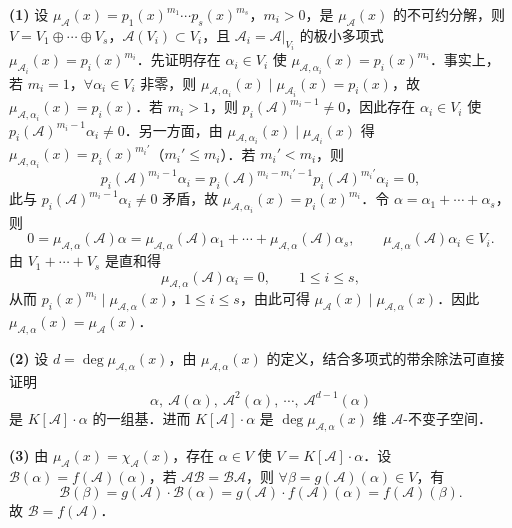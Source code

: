 \begin{solution}
\textbf{(1)} 设 $\mu_{\mathcal{A}}(x)=p_1(x)^{m_1}\cdots p_s(x)^{m_s}$，$m_i>0$，是 $\mu_{\mathcal{A}}(x)$ 的不可约分解，则 $V=V_1\oplus\cdots\oplus V_s$，$\mathcal{A}(V_i)\subset V_i$，且 $\mathcal{A}_i=\mathcal{A}|_{V_i}$ 的极小多项式 $\mu_{\mathcal{A}_i}(x)=p_i(x)^{m_i}$．先证明存在 $\alpha_i\in V_i$ 使 $\mu_{\mathcal{A},\alpha_i}(x)=p_i(x)^{m_i}$．事实上，若 $m_i=1$，$\forall\alpha_i\in V_i$ 非零，则 $\mu_{\mathcal{A},\alpha_i}(x)\mid\mu_{\mathcal{A}_i}(x)=p_i(x)$，故 $\mu_{\mathcal{A},\alpha_i}(x)=p_i(x)$．若 $m_i>1$，则 $p_i(\mathcal{A})^{m_i-1}\neq 0$，因此存在 $\alpha_i\in V_i$ 使 $p_i(\mathcal{A})^{m_i-1}\alpha_i\neq 0$．另一方面，由 $\mu_{\mathcal{A},\alpha_i}(x)\mid\mu_{\mathcal{A}_i}(x)$ 得 $\mu_{\mathcal{A},\alpha_i}(x)=p_i(x)^{m_i'}$（$m_i'\leqslant m_i$）．若 $m_i'<m_i$，则
\[
p_i(\mathcal{A})^{m_i-1}\alpha_i=p_i(\mathcal{A})^{m_i-m_i'-1}p_i(\mathcal{A})^{m_i'}\alpha_i=0,
\]
此与 $p_i(\mathcal{A})^{m_i-1}\alpha_i\neq 0$ 矛盾，故 $\mu_{\mathcal{A},\alpha_i}(x)=p_i(x)^{m_i}$．令 $\alpha=\alpha_1+\cdots+\alpha_s$，则
\[
0=\mu_{\mathcal{A},\alpha}(\mathcal{A})\alpha
=\mu_{\mathcal{A},\alpha}(\mathcal{A})\alpha_1+\cdots+\mu_{\mathcal{A},\alpha}(\mathcal{A})\alpha_s,
\qquad \mu_{\mathcal{A},\alpha}(\mathcal{A})\alpha_i\in V_i.
\]
由 $V_1+\cdots+V_s$ 是直和得
\[
\mu_{\mathcal{A},\alpha}(\mathcal{A})\alpha_i=0,\qquad 1\leqslant i\leqslant s,
\]
从而 $p_i(x)^{m_i}\mid\mu_{\mathcal{A},\alpha}(x)$，$1\leqslant i\leqslant s$，由此可得 $\mu_{\mathcal{A}}(x)\mid\mu_{\mathcal{A},\alpha}(x)$．因此 $\mu_{\mathcal{A},\alpha}(x)=\mu_{\mathcal{A}}(x)$．

\textbf{(2)} 设 $d=\deg\mu_{\mathcal{A},\alpha}(x)$，由 $\mu_{\mathcal{A},\alpha}(x)$ 的定义，结合多项式的带余除法可直接证明
\[
\alpha,\ \mathcal{A}(\alpha),\ \mathcal{A}^2(\alpha),\ \cdots,\ \mathcal{A}^{d-1}(\alpha)
\]
是 $K[\mathcal{A}]\cdot\alpha$ 的一组基．进而 $K[\mathcal{A}]\cdot\alpha$ 是 $\deg\mu_{\mathcal{A},\alpha}(x)$ 维 $\mathcal{A}$-不变子空间．

\textbf{(3)} 由 $\mu_{\mathcal{A}}(x)=\chi_{\mathcal{A}}(x)$，存在 $\alpha\in V$ 使 $V=K[\mathcal{A}]\cdot\alpha$．设 $\mathcal{B}(\alpha)=f(\mathcal{A})(\alpha)$，若 $\mathcal{A}\mathcal{B}=\mathcal{B}\mathcal{A}$，则 $\forall\beta=g(\mathcal{A})(\alpha)\in V$，有
\[
\mathcal{B}(\beta)=g(\mathcal{A})\cdot\mathcal{B}(\alpha)
=g(\mathcal{A})\cdot f(\mathcal{A})(\alpha)=f(\mathcal{A})(\beta).
\]
故 $\mathcal{B}=f(\mathcal{A})$．
\end{solution}

